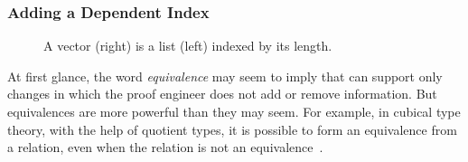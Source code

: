 %

\subsubsection*{Adding a Dependent Index}
\label{sec:ex2}

\begin{figure*}
\begin{minipage}{0.40\textwidth}
   
\end{minipage}
\hfill
\begin{minipage}{0.58\textwidth}
   
\end{minipage}
\vspace{-0.3cm}
\caption{A vector (right) is a list (left) indexed by its length.}
\label{fig:listtovect}
\end{figure*}

At first glance, the word \textit{equivalence} may seem to imply that \toolname can support only changes in
which the proof engineer does not add or remove information.
But equivalences are more powerful than they may seem.
For example, in cubical type theory, with the help of quotient types, it is possible to form an equivalence
from a relation, even when the relation is not an equivalence~\cite{angiuli2020internalizing}.


